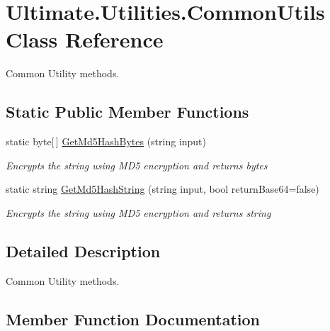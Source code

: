 \hypertarget{class_ultimate_1_1_utilities_1_1_common_utils}{}\section{Ultimate.\+Utilities.\+Common\+Utils Class Reference}
\label{class_ultimate_1_1_utilities_1_1_common_utils}


Common Utility methods.  


\subsection*{Static Public Member Functions}
\begin{DoxyCompactItemize}
\item 
static byte\mbox{[}$\,$\mbox{]} \hyperlink{class_ultimate_1_1_utilities_1_1_common_utils_a62622b530e6c3ca623db3e327d37b609}{Get\+Md5\+Hash\+Bytes} (string input)
\begin{DoxyCompactList}\small\item\em Encrypts the string using M\+D5 encryption and returns bytes \end{DoxyCompactList}\item 
static string \hyperlink{class_ultimate_1_1_utilities_1_1_common_utils_acb3095e85ccbc98a44c0051d61fba40b}{Get\+Md5\+Hash\+String} (string input, bool return\+Base64=false)
\begin{DoxyCompactList}\small\item\em Encrypts the string using M\+D5 encryption and returns string \end{DoxyCompactList}\end{DoxyCompactItemize}


\subsection{Detailed Description}
Common Utility methods. 



\subsection{Member Function Documentation}
